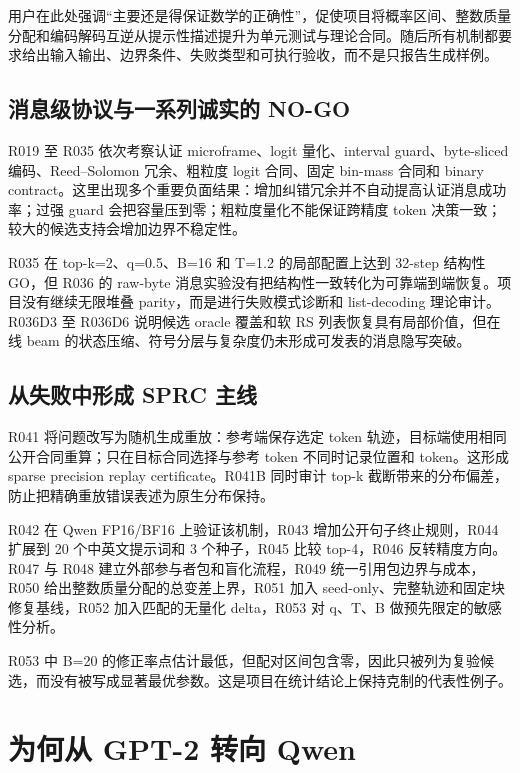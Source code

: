 \documentclass[12pt,a4paper]{article}
\begin{document}
用户在此处强调“主要还是得保证数学的正确性”，促使项目将概率区间、整数质量分配和编码解码互逆从提示性描述提升为单元测试与理论合同。随后所有机制都要求给出输入输出、边界条件、失败类型和可执行验收，而不是只报告生成样例。

\subsection{消息级协议与一系列诚实的 NO-GO}

R019 至 R035 依次考察认证 microframe、logit 量化、interval guard、byte-sliced 编码、Reed--Solomon 冗余、粗粒度 logit 合同、固定 bin-mass 合同和 binary contract。这里出现多个重要负面结果：增加纠错冗余并不自动提高认证消息成功率；过强 guard 会把容量压到零；粗粒度量化不能保证跨精度 token 决策一致；较大的候选支持会增加边界不稳定性。

R035 在 top-k=2、q=0.5、B=16 和 T=1.2 的局部配置上达到 32-step 结构性 GO，但 R036 的 raw-byte 消息实验没有把结构性一致转化为可靠端到端恢复。项目没有继续无限堆叠 parity，而是进行失败模式诊断和 list-decoding 理论审计。R036D3 至 R036D6 说明候选 oracle 覆盖和软 RS 列表恢复具有局部价值，但在线 beam 的状态压缩、符号分层与复杂度仍未形成可发表的消息隐写突破。

\subsection{从失败中形成 SPRC 主线}

R041 将问题改写为随机生成重放：参考端保存选定 token 轨迹，目标端使用相同公开合同重算；只在目标合同选择与参考 token 不同时记录位置和 token。这形成 sparse precision replay certificate。R041B 同时审计 top-k 截断带来的分布偏差，防止把精确重放错误表述为原生分布保持。

R042 在 Qwen FP16/BF16 上验证该机制，R043 增加公开句子终止规则，R044 扩展到 20 个中英文提示词和 3 个种子，R045 比较 top-4，R046 反转精度方向。R047 与 R048 建立外部参与者包和盲化流程，R049 统一引用包边界与成本，R050 给出整数质量分配的总变差上界，R051 加入 seed-only、完整轨迹和固定块修复基线，R052 加入匹配的无量化 delta，R053 对 q、T、B 做预先限定的敏感性分析。

R053 中 B=20 的修正率点估计最低，但配对区间包含零，因此只被列为复验候选，而没有被写成显著最优参数。这是项目在统计结论上保持克制的代表性例子。

\section{为何从 GPT-2 转向 Qwen}
\end{document}
